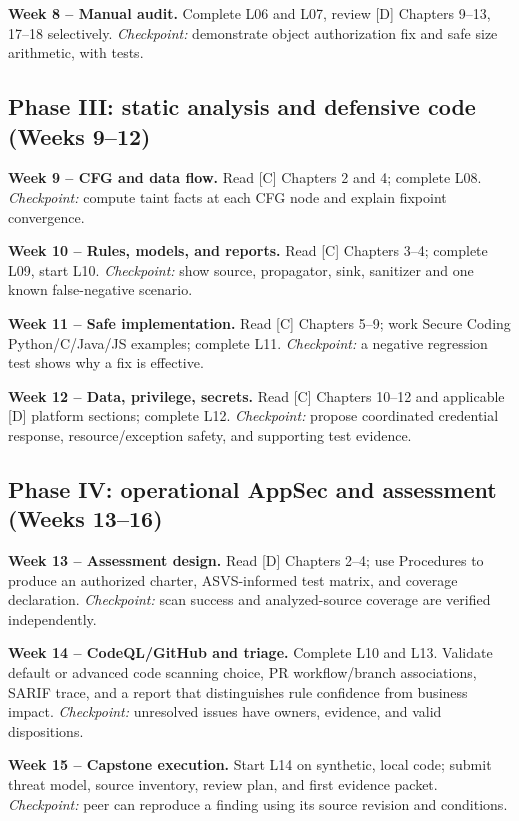 \documentclass[
  letterpaper,
]{article}
\begin{document}
\textbf{Week 8 -- Manual audit.} Complete L06 and L07, review {[}D{]}
Chapters 9--13, 17--18 selectively. \emph{Checkpoint:} demonstrate
object authorization fix and safe size arithmetic, with tests.

\subsection{Phase III: static analysis and defensive code (Weeks
9--12)}\label{phase-iii-static-analysis-and-defensive-code-weeks-912}

\textbf{Week 9 -- CFG and data flow.} Read {[}C{]} Chapters 2 and 4;
complete L08. \emph{Checkpoint:} compute taint facts at each CFG node
and explain fixpoint convergence.

\textbf{Week 10 -- Rules, models, and reports.} Read {[}C{]} Chapters
3--4; complete L09, start L10. \emph{Checkpoint:} show source,
propagator, sink, sanitizer and one known false-negative scenario.

\textbf{Week 11 -- Safe implementation.} Read {[}C{]} Chapters 5--9;
work Secure Coding Python/C/Java/JS examples; complete L11.
\emph{Checkpoint:} a negative regression test shows why a fix is
effective.

\textbf{Week 12 -- Data, privilege, secrets.} Read {[}C{]} Chapters
10--12 and applicable {[}D{]} platform sections; complete L12.
\emph{Checkpoint:} propose coordinated credential response,
resource/exception safety, and supporting test evidence.

\subsection{Phase IV: operational AppSec and assessment (Weeks
13--16)}\label{phase-iv-operational-appsec-and-assessment-weeks-1316}

\textbf{Week 13 -- Assessment design.} Read {[}D{]} Chapters 2--4; use
Procedures to produce an authorized charter, ASVS-informed test matrix,
and coverage declaration. \emph{Checkpoint:} scan success and
analyzed-source coverage are verified independently.

\textbf{Week 14 -- CodeQL/GitHub and triage.} Complete L10 and L13.
Validate default or advanced code scanning choice, PR workflow/branch
associations, SARIF trace, and a report that distinguishes rule
confidence from business impact. \emph{Checkpoint:} unresolved issues
have owners, evidence, and valid dispositions.

\textbf{Week 15 -- Capstone execution.} Start L14 on synthetic, local
code; submit threat model, source inventory, review plan, and first
evidence packet. \emph{Checkpoint:} peer can reproduce a finding using
its source revision and conditions.
\end{document}
